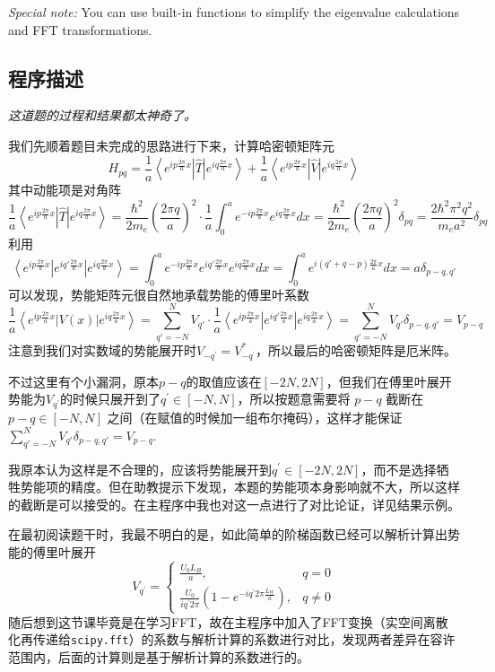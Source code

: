 \noindent \textit{Special note:} You can use built-in functions to simplify the eigenvalue calculations and FFT transformations.


\subsection{程序描述}
\textit{这道题的过程和结果都太神奇了。}

我们先顺着题目未完成的思路进行下来，计算哈密顿矩阵元
\[
H_{pq} = \frac{1}{a}\left\langle e^{ip\frac{2\pi}{a}x} \left| \hat{T} \right| e^{iq\frac{2\pi}{a}x} \right\rangle + \frac{1}{a}\left\langle e^{ip\frac{2\pi}{a}x} \left| \hat{V} \right| e^{iq\frac{2\pi}{a}x} \right\rangle
\]
其中动能项是对角阵
\[
    \frac{1}{a}\left\langle e^{ip\frac{2\pi}{a}x} \left| \hat{T} \right| e^{iq\frac{2\pi}{a}x} \right\rangle = \frac{\hbar^2}{2 m_e} \left( \frac{2\pi q}{a} \right)^2 \cdot\frac{1}{a}\int_0^a e^{-ip\frac{2\pi}{a}x} e^{iq\frac{2\pi}{a}x} dx= \frac{\hbar^2}{2 m_e} \left( \frac{2\pi q}{a} \right)^2 \delta_{pq} = \frac{2 \hbar^2 \pi^2 q^2}{m_e a^2} \delta_{pq}
\]
利用
\[
\left\langle e^{ip\frac{2\pi}{a}x} \left| e^{iq'\frac{2\pi}{a}x} \right| e^{iq\frac{2\pi}{a}x} \right\rangle = \int_0^a e^{-ip\frac{2\pi}{a}x} e^{iq'\frac{2\pi}{a}x} e^{iq\frac{2\pi}{a}x} dx = \int_0^a e^{i(q' + q - p)\frac{2\pi}{a}x} dx = a \delta_{p - q, q'}
\]
可以发现，势能矩阵元很自然地承载势能的傅里叶系数
\[
    \frac{1}{a}\left\langle e^{ip\frac{2\pi}{a}x} \left| V(x) \right| e^{iq\frac{2\pi}{a}x} \right\rangle = \sum_{q'=-N}^N V_{q'} \cdot \frac{1}{a} \left\langle e^{ip\frac{2\pi}{a}x} \left| e^{iq'\frac{2\pi}{a}x} \right| e^{iq\frac{2\pi}{a}x} \right\rangle=\sum_{q'=-N}^N V_{q'} \delta_{p - q, q'} = V_{p - q}
\]
注意到我们对实数域的势能展开时$V_{-q^{\prime}}=V_{-q^{\prime}}^{*}$，所以最后的哈密顿矩阵是厄米阵。


不过这里有个小漏洞，原本$p - q$的取值应该在$[-2N,2N]$，但我们在傅里叶展开势能为$V_{q^\prime}$的时候只展开到了$q^\prime \in [-N,N]$，所以按题意需要将 $p - q$ 截断在$ p - q  \in [-N,N]$ 之间（在赋值的时候加一组布尔掩码），这样才能保证$\sum_{q'=-N}^N V_{q'} \delta_{p - q, q'} = V_{p - q}.$

我原本认为这样是不合理的，应该将势能展开到$q^\prime \in [-2N,2N]$，而不是选择牺牲势能项的精度。但在助教提示下发现，本题的势能项本身影响就不大，所以这样的截断是可以接受的。在主程序中我也对这一点进行了对比论证，详见结果示例。

在最初阅读题干时，我最不明白的是，如此简单的阶梯函数已经可以解析计算出势能的傅里叶展开
\[
V_{q^{\prime}}=\begin{cases}\frac{U_0L_B}{a},&q=0\\\frac{U_0}{i{q^{\prime}}2\pi}\left(1-e^{-i{q^{\prime}}2\pi\frac{L_W}{a}}\right),&q\neq0\end{cases}
\]
随后想到这节课毕竟是在学习FFT，故在主程序中加入了FFT变换（实空间离散化再传递给\texttt{scipy.fft}）的系数与解析计算的系数进行对比，发现两者差异在容许范围内，后面的计算则是基于解析计算的系数进行的。

